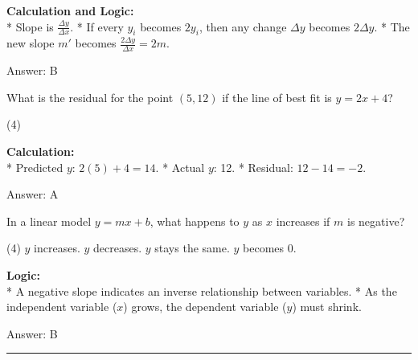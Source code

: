 \documentclass[11pt,paper=a4,answers]{exam}
\begin{document}
\begin{questions}
\begin{solution}
\vspace{30pt}

\textbf{Calculation and Logic:} \\
* Slope is $\frac{\Delta y}{\Delta x}$.
* If every $y_i$ becomes $2y_i$, then any change $\Delta y$ becomes $2\Delta y$.
* The new slope $m'$ becomes $\frac{2\Delta y}{\Delta x} = 2m$.

\vspace{30pt}

Answer: \colorbox{yellow!100}{B}
\end{solution}

\vspace{60pt}

\question
What is the residual for the point $(5, 12)$ if the line of best fit is $y = 2x + 4$?
\begin{tasks}(4)
\end{tasks}

\begin{solution}
\textbf{Calculation:} \\
* Predicted $y$: $2(5) + 4 = 14$.
* Actual $y$: 12.
* Residual: $12 - 14 = -2$.

\vspace{30pt}

Answer: \colorbox{yellow!100}{A}
\end{solution}

\vspace{60pt}

\question
In a linear model $y = mx + b$, what happens to $y$ as $x$ increases if $m$ is negative?
\begin{tasks}(4)
    \task $y$ increases.
    \task $y$ decreases.
    \task $y$ stays the same.
    \task $y$ becomes 0.
\end{tasks}

\begin{solution}
\textbf{Logic:} \\
* A negative slope indicates an inverse relationship between variables.
* As the independent variable ($x$) grows, the dependent variable ($y$) must shrink.

\vspace{30pt}

Answer: \colorbox{yellow!100}{B}
\end{solution}


\end{questions}
\begin{center}
\rule{.5\textwidth}{1pt}
\end{center}
\end{document}

